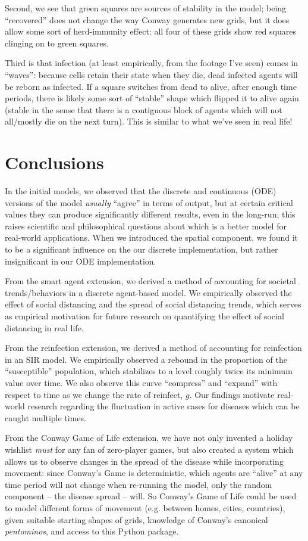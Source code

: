 \documentclass[twoside]{extarticle}                                    %
\numberwithin{equation}{section}                                       %
\begin{document}
Second, we see that green squares are sources of stability in the model; being ``recovered'' does not change the way Conway generates new grids, but it does allow some sort of herd-immunity effect: all four of these grids show red squares clinging on to green squares.

Third is that infection (at least empirically, from the footage I've seen) comes in ``waves'': because cells retain their state when they die, dead infected agents will be reborn as infected. If a square switches from dead to alive, after enough time periods, there is likely some sort of ``stable'' shape which flipped it to alive again (stable in the sense that there is a contiguous block of agents which will not all/mostly die on the next turn). This is similar to what we've seen in real life!


\section{Conclusions}
In the initial models, we observed that the discrete and continuous (ODE) versions of the model \emph{usually} ``agree'' in terms of output, but at certain critical values they can produce significantly different results, even in the long-run; this raises scientific and philosophical questions about which is a better model for real-world applications. When we introduced the spatial component, we found it to be a significant influence on the our discrete implementation, but rather insignificant in our ODE implementation.

From the smart agent extension, we derived a method of accounting for societal trends/behaviors in a discrete agent-based model. We empirically observed the effect of social distancing and the spread of social distancing trends, which serves as empirical motivation for future research on quantifying the effect of social distancing in real life.

From the reinfection extension, we derived a method of accounting for reinfection in an SIR model. We empirically observed a rebound in the proportion of the ``susceptible'' population, which stabilizes to a level roughly twice its minimum value over time. We also observe this curve ``compress'' and ``expand'' with respect to time as we change the rate of reinfect, $g$. Our findings motivate real-world research regarding the fluctuation in active cases for diseases which can be caught multiple times.

From the Conway Game of Life extension, we have not only invented a holiday wishlist \emph{must} for any fan of zero-player games, but also created a system which allows us to observe changes in the spread of the disease while incorporating movement: since Conway's Game is deterministic, which agents are ``alive'' at any time period will not change when re-running the model, only the random component -- the disease spread -- will. So Conway's Game of Life could be used to model different forms of movement (e.g. between homes, cities, countries), given suitable starting shapes of grids, knowledge of Conway's canonical \emph{pentominos}, and access to this Python package.
\end{document}
